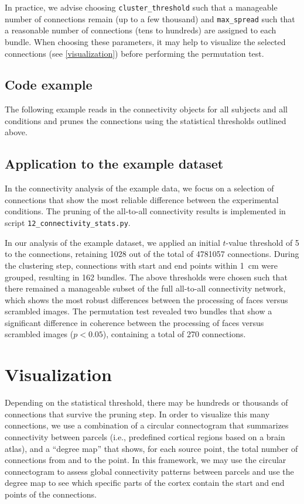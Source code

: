 \documentclass[utf8]{frontiersSCNS}
\newcommand{\code}[1]{\lstinline{#1}}
\begin{document}
In practice, we advise choosing \code{cluster_threshold} such that a manageable number of connections remain (up to a few thousand) and \code{max_spread} such that a reasonable number of connections (tens to hundreds) are assigned to each bundle.
When choosing these parameters, it may help to visualize the selected connections (see \autoref{visualization}) before performing the permutation test.

\subsection{Code example}

The following example reads in the connectivity objects for all subjects and all conditions and prunes the connections using the statistical thresholds outlined above.



\subsection{Application to the example dataset}

In the connectivity analysis of the example data, we focus on a selection of connections that show the most reliable difference between the experimental conditions.
The pruning of the all-to-all connectivity results is implemented in script \code{12_connectivity_stats.py}. 

In our analysis of the example dataset, we applied an initial $t$-value threshold of 5 to the connections, retaining 1028 out of the total of 4781057 connections.
During the clustering step, connections with start and end points within \SI{1}{\centi\meter} were grouped, resulting in 162 bundles.
The above thresholds were chosen such that there remained a manageable subset of the full all-to-all connectivity network, which shows the most robust differences between the processing of faces versus scrambled images.
The permutation test revealed two bundles that show a significant difference in coherence between the processing of faces versus scrambled images ($p < 0.05$), containing a total of 270 connections.


\section{Visualization}\label{visualization}

Depending on the statistical threshold, there may be hundreds or thousands of connections that survive the pruning step.
In order to visualize this many connections, we use a combination of a circular connectogram that summarizes connectivity between parcels (i.e., predefined cortical regions based on a brain atlas), and a ``degree map'' that shows, for each source point, the total number of connections from and to the point.
In this framework, we may use the circular connectogram to assess global connectivity patterns between parcels and use the degree map to see which specific parts of the cortex contain the start and end points of the connections.
\end{document}
